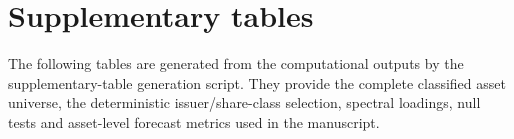 \section{Supplementary tables}
\label{app:supplementary_tables}

The following tables are generated from the computational outputs by the supplementary-table generation script. They provide the complete classified asset universe, the deterministic issuer/share-class selection, spectral loadings, null tests and asset-level forecast metrics used in the manuscript.


